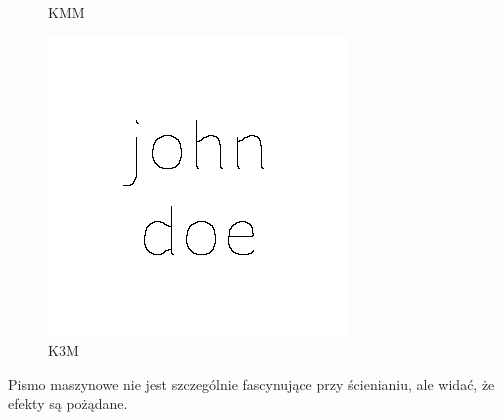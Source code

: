 \documentclass[11pt]{article}
\begin{document}
\begin{figure}[!ht]
\begin{minipage}[b]{0.5\linewidth}
    \caption{KMM} 
    \vspace{4ex}
  \end{minipage}%
  \begin{minipage}[b]{0.5\linewidth}
    \centering
    \includegraphics[width=.5\linewidth]{../samples/text_k3m} 
    \caption{K3M} 
    \vspace{4ex}
  \end{minipage} 
\end{figure}
\FloatBarrier

\par
Pismo maszynowe nie jest szczególnie fascynujące przy ścienianiu, ale widać, że efekty są pożądane.
\end{document}
